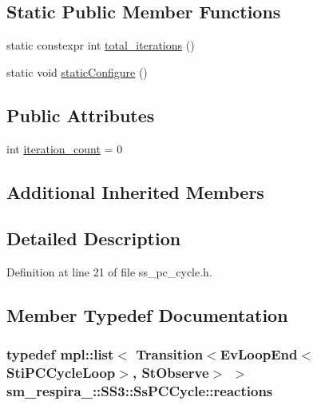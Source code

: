 \subsection*{Static Public Member Functions}
\begin{DoxyCompactItemize}
\item 
static constexpr int \hyperlink{structsm__respira__1_1_1SS3_1_1SsPCCycle_a9d53ab702ea684b8856696cca20f1115}{total\+\_\+iterations} ()
\item 
static void \hyperlink{structsm__respira__1_1_1SS3_1_1SsPCCycle_a94b00884a6ca90ba16b8207ece448ea4}{static\+Configure} ()
\end{DoxyCompactItemize}
\subsection*{Public Attributes}
\begin{DoxyCompactItemize}
\item 
int \hyperlink{structsm__respira__1_1_1SS3_1_1SsPCCycle_ad4242946ceb38c89f6e4c916139a2e93}{iteration\+\_\+count} = 0
\end{DoxyCompactItemize}
\subsection*{Additional Inherited Members}


\subsection{Detailed Description}


Definition at line 21 of file ss\+\_\+pc\+\_\+cycle.\+h.



\subsection{Member Typedef Documentation}
\subsubsection[{\texorpdfstring{reactions}{reactions}}]{\setlength{\rightskip}{0pt plus 5cm}typedef mpl\+::list$<$ Transition$<$Ev\+Loop\+End$<${\bf Sti\+P\+C\+Cycle\+Loop}$>$, {\bf St\+Observe}$>$ $>$ {\bf sm\+\_\+respira\+\_\+::\+S\+S3\+::\+Ss\+P\+C\+Cycle\+::reactions}}\hypertarget{structsm__respira__1_1_1SS3_1_1SsPCCycle_a04b24f141aa6ad55e40be05fe81d9c8b}{}\label{structsm__respira__1_1_1SS3_1_1SsPCCycle_a04b24f141aa6ad55e40be05fe81d9c8b}



